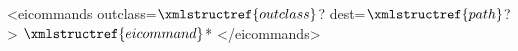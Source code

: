 <eicommands outclass=$\xmlstructref{outclass}$? dest=$\xmlstructref{path}$?>
  $\xmlstructref{eicommand}$*
</eicommands>

